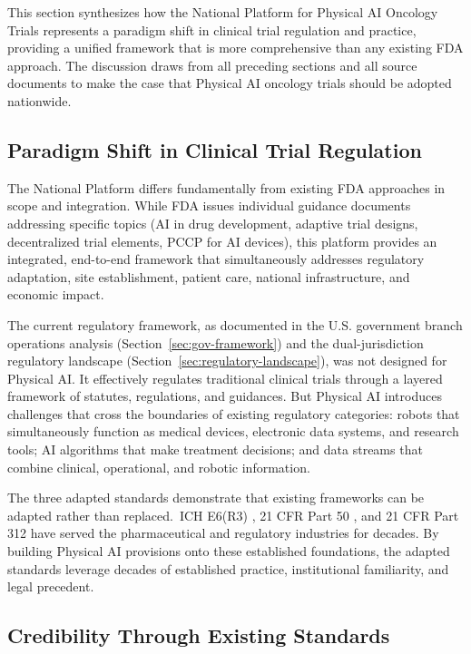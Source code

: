 
This section synthesizes how the National Platform for Physical AI Oncology
Trials represents a paradigm shift in clinical trial regulation and practice,
providing a unified framework that is more comprehensive than any existing FDA
approach. The discussion draws from all preceding sections and all source
documents to make the case that Physical AI oncology trials should be adopted
nationwide.

\subsection{Paradigm Shift in Clinical Trial Regulation}
\label{subsec:discuss-paradigm}

The National Platform differs fundamentally from existing FDA approaches in
scope and integration. While FDA issues individual guidance documents addressing
specific topics (AI in drug development, adaptive trial designs, decentralized
trial elements, PCCP for AI devices), this platform provides an integrated,
end-to-end framework that simultaneously addresses regulatory adaptation, site
establishment, patient care, national infrastructure, and economic impact.

The current regulatory framework, as documented in the U.S. government branch
operations analysis (Section~\ref{sec:gov-framework}) and the dual-jurisdiction
regulatory landscape (Section~\ref{sec:regulatory-landscape}), was not designed
for Physical AI. It effectively regulates traditional clinical trials through a
layered framework of statutes, regulations, and guidances. But Physical AI
introduces challenges that cross the boundaries of existing regulatory
categories: robots that simultaneously function as medical devices, electronic
data systems, and research tools; AI algorithms that make treatment decisions;
and data streams that combine clinical, operational, and robotic information.

The three adapted standards \cite{ich-adapt, cfr50-adapt, cfr312-adapt}
demonstrate that existing frameworks can be adapted rather than replaced.\ ICH
E6(R3) \cite{ich-e6r3}, 21 CFR Part 50 \cite{cfr-part-50}, and 21 CFR Part
312 \cite{cfr-part-312} have served the pharmaceutical and regulatory
industries for decades. By building Physical AI provisions onto these
established foundations, the adapted standards leverage decades of established
practice, institutional familiarity, and legal precedent.

\subsection{Credibility Through Existing Standards}
\label{subsec:discuss-credibility}

